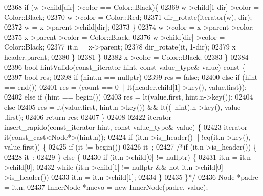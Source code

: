 \begin{DoxyCode}
02368                 \textcolor{keywordflow}{if} (w->child[dir]->color == Color::Black)\{
02369                     w->child[1-dir]->color = Color::Black;
02370                     w->color = Color::Red;
02371                     dir\_rotate(iterator(w), dir);
02372                     w = x->parent->child[dir];
02373                 \}
02374                 w->color = x->parent->color;
02375                 x->parent->color = Color::Black;
02376                 w->child[dir]->color = Color::Black;
02377                 it.n = x->parent;
02378                 dir\_rotate(it, 1-dir);
02379                 x = header.parent;
02380             \}
02381         \}
02382         x->color = Color::Black;
02383     \}
02384 
02396     \textcolor{keywordtype}{bool} hintValido(const\_iterator hint, \textcolor{keyword}{const} value\_type& value)\textcolor{keyword}{ const }\{
02397         \textcolor{keywordtype}{bool} res;
02398         \textcolor{keywordflow}{if} (hint.n == \textcolor{keyword}{nullptr})
02399             res = \textcolor{keyword}{false};
02400         \textcolor{keywordflow}{else} \textcolor{keywordflow}{if} (hint == end())
02401             res = (count == 0 || lt(header.child[1]->key(), value.first));
02402         \textcolor{keywordflow}{else} \textcolor{keywordflow}{if} (hint == begin())
02403             res = lt(value.first, hint.n->key());
02404         \textcolor{keywordflow}{else}
02405             res = lt(value.first, hint.n->key()) && lt((--hint).n->key(), value
      .first);
02406         \textcolor{keywordflow}{return} res;
02407     \}
02408 
02422     iterator insert\_rapido(const\_iterator hint, \textcolor{keyword}{const} value\_type& value) \{
02423         iterator it(const\_cast<Node*>(hint.n));
02424         \textcolor{keywordflow}{if} (it.n->is\_header() || !eq(it.n->key(), value.first)) \{
02425             \textcolor{keywordflow}{if} (it != begin())
02426                 it--;
02427             \textcolor{comment}{/*if (it.n->is\_header()) \{}
02428 \textcolor{comment}{                it--;}
02429 \textcolor{comment}{            \} else \{}
02430 \textcolor{comment}{                if (it.n->child[0] != nullptr) \{}
02431 \textcolor{comment}{                    it.n = it.n->child[0];}
02432 \textcolor{comment}{                    while (it.n->child[1] != nullptr && not
       it.n->child[0]->is\_header())}
02433 \textcolor{comment}{                        it.n = it.n->child[1];}
02434 \textcolor{comment}{                \}}
02435 \textcolor{comment}{            \}*/}
02436             Node *padre = it.n;
02437             InnerNode *nuevo = \textcolor{keyword}{new} InnerNode(padre, value);

\end{DoxyCode}
